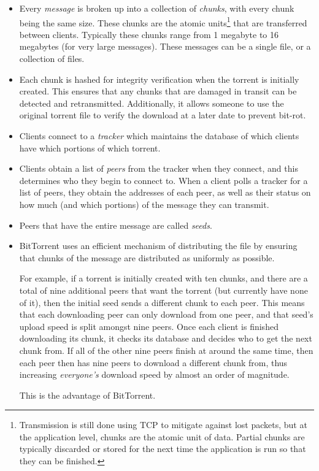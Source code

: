\documentclass{article}
\theoremstyle{remark}
\theoremstyle{definition}
\theoremstyle{definition}
\theoremstyle{definition}
\begin{document}
\begin{itemize}
\item Every \emph{message} is broken up into a collection of \emph{chunks}, with every chunk being the same size. These chunks are the atomic units\footnote{Transmission is still done using TCP to mitigate against lost packets, but at the application level, chunks are the atomic unit of data. Partial chunks are typically discarded or stored for the next time the application is run so that they can be finished.} that are transferred between clients. Typically these chunks range from 1 megabyte to 16 megabytes (for very large messages). These messages can be a single file, or a collection of files.
\item Each chunk is hashed for integrity verification when the torrent is initially created. This ensures that any chunks that are damaged in transit can be detected and retransmitted. Additionally, it allows someone to use the original torrent file to verify the download at a later date to prevent bit-rot.
\item Clients connect to a \emph{tracker} which maintains the database of which clients have which portions of which torrent.
\item Clients obtain a list of \emph{peers} from the tracker when they connect, and this determines who they begin to connect to. When a client polls a tracker for a list of peers, they obtain the addresses of each peer, as well as their status on how much (and which portions) of the message they can transmit.
\item Peers that have the entire message are called \emph{seeds}.
\item BitTorrent uses an efficient mechanism of distributing the file by ensuring that chunks of the message are distributed as uniformly as possible. 

For example, if a torrent is initially created with ten chunks, and there are a total of nine additional peers that want the torrent (but currently have none of it), then the initial seed sends a different chunk to each peer. This means that each downloading peer can only download from one peer, and that seed's upload speed is split amongst nine peers. Once each client is finished downloading its chunk, it checks its database and decides who to get the next chunk from. If all of the other nine peers finish at around the same time, then each peer then has nine peers to download a different chunk from, thus increasing \emph{everyone's} download speed by almost an order of magnitude.

This is the advantage of BitTorrent.
\end{itemize}
\end{document}
